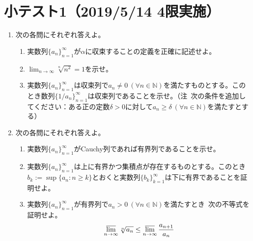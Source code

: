 \documentclass[dvipdfmx,a4j,10pt]{jsarticle}
\theoremstyle{mystyle1}
\theoremstyle{mystyle2}
\begin{document}
\section*{小テスト1（2019/5/14 4限実施）}
\begin{enumerate}
\item 次の各問にそれぞれ答えよ。
\begin{enumerate}
\renewcommand{\labelenumii}{(\arabic{enumii})}
\item 実数列$\{a_n\}_{n=1}^\infty$が$\alpha$に収束することの定義を正確に記述せよ。
\item $\displaystyle\lim_{n\to\infty}\sqrt[n]{n^2}=1$を示せ。
\item 実数列$\{a_n\}_{n=1}^\infty$は収束列で$a_n\neq0\ (\forall n\in\mathbb{N})$を満たすものとする。このとき数列$\displaystyle\{1/a_n\}_{n=1}^\infty$は収束列であることを示せ。（注\ 次の条件を追加してください：ある正の定数$\delta>0$に対して$a_n\geq\delta\ (\forall n\in\mathbb{N})$を満たすとする）
\end{enumerate}
\item 次の各問にそれぞれ答えよ。
\begin{enumerate}
\renewcommand{\labelenumii}{(\arabic{enumii})}
\item 実数列$\{a_n\}_{n=1}^\infty$がCauchy列であれば有界列であることを示せ。
\item 実数列$\{a_n\}_{n=1}^\infty$は上に有界かつ集積点が存在するものとする。このとき$b_k:=\sup\{a_n:n\geq k\}$とおくと実数列$\{b_k\}_{k=1}^\infty$は下に有界であることを証明せよ。
\item 実数列$\{a_n\}_{n=1}^\infty$が有界列で$a_n>0\ (\forall n\in\mathbb{N})$を満たすとき\ 次の不等式を証明せよ。
\[
\varlimsup_{n\to\infty}\sqrt[n]{a_n}\leq\varlimsup_{n\to\infty}\frac{a_{n+1}}{a_n}
\]
\end{enumerate}
\end{enumerate}
\end{document}
